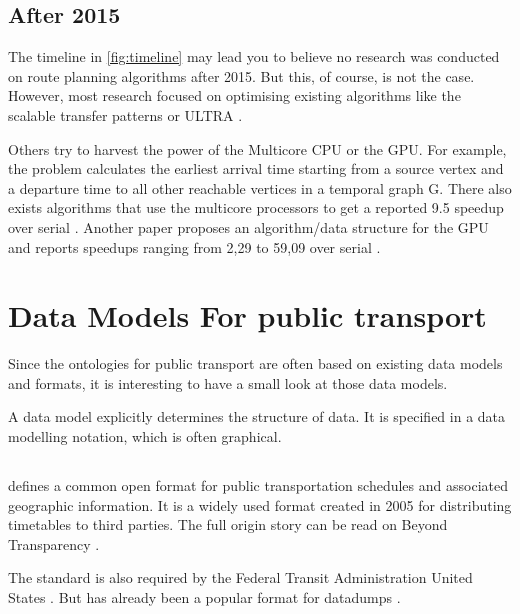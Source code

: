 \subsection{After 2015}
The timeline in \autoref{fig:timeline} may lead you to believe no research was conducted on route planning algorithms after 2015. But this, of course, is not the case. However, most research focused on optimising existing algorithms like the scalable transfer patterns\cite{bast_scalable_2015} or ULTRA \cite{baum_ultra_2023}.

Others try to harvest the power of the Multicore CPU or the GPU. For example, the  problem calculates the earliest arrival time starting from a source vertex and a departure time to all other reachable vertices in a temporal graph G. There also exists algorithms that use the multicore processors to get a reported 9.5 speedup over serial  \cite{ni_parallel_2017}. Another paper proposes an algorithm/data structure for the GPU and reports speedups ranging from 2,29 to 59,09 over serial  \cite{haryan_gpu_2020}.


\section{Data Models For public transport}\label{section:data_model_rel_work}

Since the ontologies for public transport are often based on existing data models and formats, it is interesting to have a small look at those data models.

A data model explicitly determines the structure of data. It is specified in a data modelling notation, which is often graphical.

\subsection{}
 defines a common open format for public transportation schedules and associated geographic information. It is a widely used format created in 2005 for distributing timetables to third parties. The full origin story can be read on Beyond Transparency \cite{noauthor_pioneering_nodate}.

The standard is also required by the Federal Transit Administration United States \cite{noauthor_national_2023}. But has already been a popular format for datadumps \cite{noauthor_welcome_nodate,noauthor_mobility_nodate}. 


